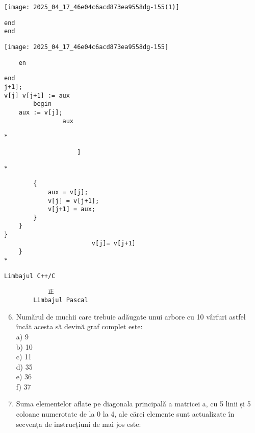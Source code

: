 \begin{center}
\texttt{[image: 2025\_04\_17\_46e04c6acd873ea9558dg-155(1)]}
\end{center}

\begin{verbatim}
end
end
\end{verbatim}

\begin{center}
\texttt{[image: 2025\_04\_17\_46e04c6acd873ea9558dg-155]}
\end{center}

\begin{verbatim}
    en
\end{verbatim}

\begin{verbatim}
end
j+1];
v[j] v[j+1] := aux
        begin
    aux := v[j];
                aux
\end{verbatim}

\begin{verbatim}
*
\end{verbatim}

\begin{verbatim}
                    ]
\end{verbatim}

\begin{verbatim}
*
\end{verbatim}

\begin{verbatim}
        {
            aux = v[j];
            v[j] = v[j+1];
            v[j+1] = aux;
        }
    }
}
                        v[j]= v[j+1]
    }
*
\end{verbatim}

\begin{verbatim}
Limbajul C++/C
\end{verbatim}

\begin{verbatim}
            正
        Limbajul Pascal
\end{verbatim}

\begin{enumerate}
  \setcounter{enumi}{5}
  \item Numărul de muchii care trebuie adăugate unui arbore cu 10 vârfuri astfel încât acesta să devină graf complet este:\\
a) 9\\
b) 10\\
c) 11\\
d) 35\\
e) 36\\
f) 37
  \item Suma elementelor aflate pe diagonala principală a matricei a, cu 5 linii și 5 coloane numerotate de la 0 la 4, ale cărei elemente sunt actualizate în secvența de instrucțiuni de mai jos este:
\end{enumerate}

